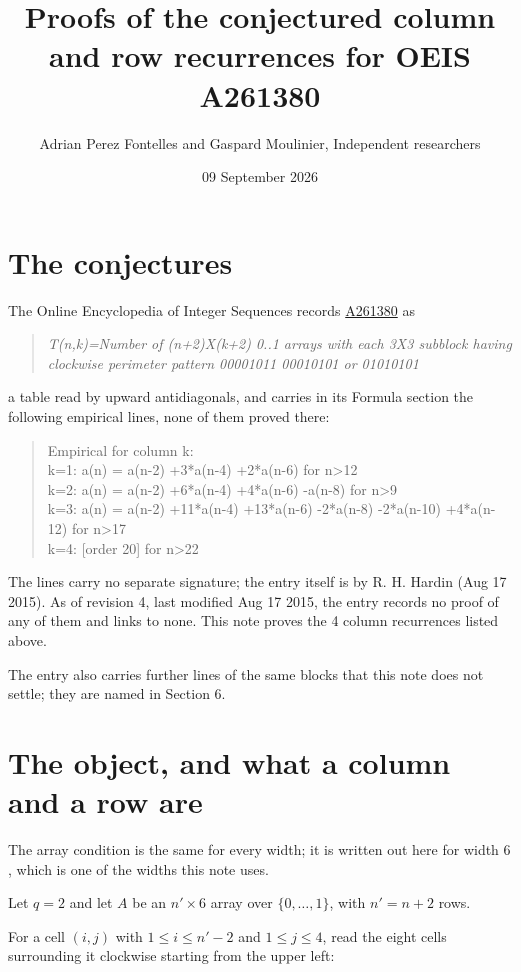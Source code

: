 \documentclass[11pt]{article}
\title{Proofs of the conjectured column and row recurrences for OEIS A261380}
\author{Adrian Perez Fontelles and Gaspard Moulinier, Independent researchers}
\date{09 September 2026}
\theoremstyle{definition}
\begin{document}
\maketitle
\section{The conjectures}

The Online Encyclopedia of Integer Sequences records \href{https://oeis.org/A261380}{A261380} as

\begin{quote}\itshape T(n,k)=Number of (n+2)X(k+2) 0..1 arrays with each 3X3 subblock having clockwise perimeter pattern 00001011 00010101 or 01010101\end{quote}

a table read by upward antidiagonals, and carries in its Formula section the following empirical lines, none of them proved there:

\begin{quote}\ttfamily Empirical for column k:\\
k=1: a(n) = a(n-2) +3*a(n-4) +2*a(n-6) for n>12\\k=2: a(n) = a(n-2) +6*a(n-4) +4*a(n-6) -a(n-8) for n>9\\k=3: a(n) = a(n-2) +11*a(n-4) +13*a(n-6) -2*a(n-8) -2*a(n-10) +4*a(n-12) for n>17\\k=4: [order 20] for n>22\end{quote}

The lines carry no separate signature; the entry itself is by R. H. Hardin (Aug 17 2015). As of revision 4, last modified Aug 17 2015, the entry records no proof of any of them and links to none. This note proves the 4 column recurrences listed above.

The entry also carries further lines of the same blocks that this note does not settle; they are named in Section 6.

\section{The object, and what a column and a row are}

The array condition is the same for every width; it is written out here for width $6$, which is one of the widths this note uses.

Let $q = 2$ and let $A$ be an $n' \times 6$ array over $\{0,\dots,1\}$, with $n' = n + 2$ rows.

For a cell $(i,j)$ with $1 \le i \le n'-2$ and $1 \le j \le 4$, read the eight cells surrounding it clockwise starting from the upper left:
\end{document}
